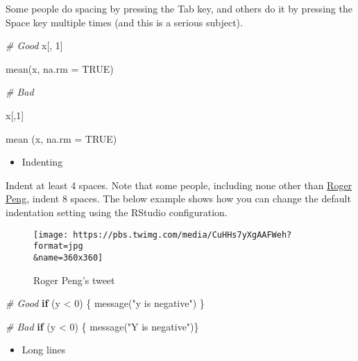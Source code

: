 \documentclass[
]{book}
\newenvironment{Shaded}{\begin{snugshade}}{\end{snugshade}}
\newcommand{\AttributeTok}[1]{\textcolor[rgb]{0.77,0.63,0.00}{#1}}
\newcommand{\CommentTok}[1]{\textcolor[rgb]{0.56,0.35,0.01}{\textit{#1}}}
\newcommand{\ConstantTok}[1]{\textcolor[rgb]{0.00,0.00,0.00}{#1}}
\newcommand{\ControlFlowTok}[1]{\textcolor[rgb]{0.13,0.29,0.53}{\textbf{#1}}}
\newcommand{\DecValTok}[1]{\textcolor[rgb]{0.00,0.00,0.81}{#1}}
\newcommand{\FunctionTok}[1]{\textcolor[rgb]{0.00,0.00,0.00}{#1}}
\newcommand{\NormalTok}[1]{#1}
\newcommand{\SpecialCharTok}[1]{\textcolor[rgb]{0.00,0.00,0.00}{#1}}
\newcommand{\StringTok}[1]{\textcolor[rgb]{0.31,0.60,0.02}{#1}}
\providecommand{\tightlist}{%
  \setlength{\itemsep}{0pt}\setlength{\parskip}{0pt}}
\begin{document}
Some people do spacing by pressing the Tab key, and others do it by pressing the Space key multiple times (and this is a serious subject).

\begin{Shaded}
\begin{Highlighting}[]
\CommentTok{\# Good}
\NormalTok{x[, }\DecValTok{1}\NormalTok{] }

\FunctionTok{mean}\NormalTok{(x, }\AttributeTok{na.rm =} \ConstantTok{TRUE}\NormalTok{) }

\CommentTok{\# Bad}

\NormalTok{x[,}\DecValTok{1}\NormalTok{]}

\FunctionTok{mean}\NormalTok{ (x, }\AttributeTok{na.rm =} \ConstantTok{TRUE}\NormalTok{)}
\end{Highlighting}
\end{Shaded}

\begin{itemize}
\tightlist
\item
  Indenting
\end{itemize}

Indent at least 4 spaces. Note that some people, including none other than \href{https://simplystatistics.org/2018/07/27/why-i-indent-my-code-8-spaces/}{Roger Peng}, indent 8 spaces. The below example shows how you can change the default indentation setting using the RStudio configuration.

\begin{figure}
\centering
\texttt{[image: https://pbs.twimg.com/media/CuHHs7yXgAAFWeh?format=jpg\\\&name=360x360]}
\caption{Roger Peng's tweet}
\end{figure}

\begin{Shaded}
\begin{Highlighting}[]
\CommentTok{\# Good}
\ControlFlowTok{if}\NormalTok{ (y }\SpecialCharTok{\textless{}} \DecValTok{0}\NormalTok{) \{}
  \FunctionTok{message}\NormalTok{(}\StringTok{"y is negative"}\NormalTok{)}
\NormalTok{\}}

\CommentTok{\# Bad}
\ControlFlowTok{if}\NormalTok{ (y }\SpecialCharTok{\textless{}} \DecValTok{0}\NormalTok{) \{}
\FunctionTok{message}\NormalTok{(}\StringTok{"Y is negative"}\NormalTok{)\}}
\end{Highlighting}
\end{Shaded}

\begin{itemize}
\tightlist
\item
  Long lines
\end{itemize}
\end{document}
